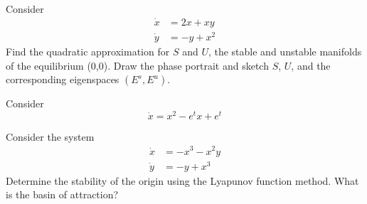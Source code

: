 \documentclass{exam}
\begin{document}
\centering
{}
\vspace{1em}

\begin{questions}

\question[20]
Consider
\begin{align*}
    \dot{x} &= 2x + xy\\
    \dot{y} &= -y + x^2
\end{align*}
Find the quadratic approximation for $S$ and $U$, the stable and unstable manifolds of the equilibrium (0,0). 
Draw the phase portrait and sketch $S$, $U$, and the corresponding eigenspaces $(E^s, E^u)$.

\question[20]
Consider
\[\dot{x} = x^2 - e^tx + e^t\]

\question[20]
Consider the system
\begin{align*}
    \dot{x} &= -x^3 - x^2y\\
    \dot{y} &= -y + x^3
\end{align*}
Determine the stability of the origin using the Lyapunov function method. What is the basin of attraction?

\end{questions}
\end{document}
